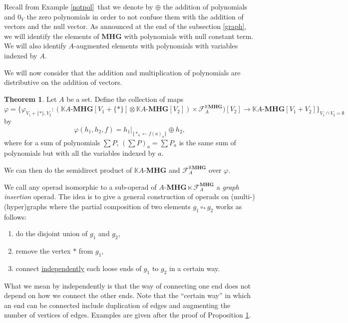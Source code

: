 \documentclass[a4paper]{article}
\DeclareMathOperator{\op}{\mathcal{O}}
\theoremstyle{definition}
\newtheorem{theorem}[definition]{Theorem}
\newcommand{\K}{\mathbb{K}}
\newcommand{\MHG}{\mathbf{MHG}}
\begin{document}
Recall from Example \ref{notpol} that we denote by $\oplus$ the addition of 
polynomials and $0_{V}$ the zero polynomials in order to not confuse them with 
the addition of vectors and the null vector. As announced at the end of the 
subsection \ref{graph}, we will identify the elements of $\MHG$ with polynomials 
with null constant term. We will also identify $A$-augmented elements with 
polynomials with variables indexed by $A$.

We will now consider that the addition and multiplication of polynomials are 
distributive on the addition of vectors.

\begin{theorem}
\label{propins}
	Let $A$ be a set. Define the collection of maps $\varphi=\{\varphi_{V_1+\{\ast\},V_2}:
	(\K A\text{-}\MHG[V_1+\{\ast\}]\otimes\K A\text{-}\MHG[V_2])\times \mathcal{F}_A^{\K \MHG})[V_2]
	\rightarrow \K A\text{-}\MHG[V_1+V_2]\}_{V_1\cap V_2=\emptyset}$ by
	\begin{equation}
		\varphi(h_1,h_2,f) = h_1|_{\{\ast_a\leftarrow f(a)_a\}}\oplus h_2,
	\end{equation}
	where for a sum of polynomials $\sum P$, $(\sum P)_a = \sum P_a$ is the same sum 
	of polynomials but with all the variables indexed by $a$.

	We can then do the semidirect product of $\K A\text{-}\MHG$ and $\mathcal{F}_A^{\K \MHG}$ over $\varphi$.
\end{theorem}

We call any operad isomorphic to a sub-operad of $A\text{-}\MHG\ltimes\mathcal{F}_A^{\MHG}$ 
a {\em graph insertion} operad. The idea is to give a general construction of 
operads on (multi-)(hyper)graphs where the partial composition of two elements 
$g_1\circ_{\ast}g_2$ works as follows:
\begin{enumerate}
	\item do the disjoint union of $g_1$ and $g_2$,
	\item remove the vertex $\ast$ from $g_1$,
	\item connect \underline{independently} each loose ends of $g_1$ to $g_2$ in a certain way.
\end{enumerate}
\noindent What we mean by independently is that the way of connecting one end does not depend on 
how we connect the other ends. Note that the ``certain way'' in which an end can be 
connected include duplication of edges and augmenting the number of vertices of edges. 
Examples are given after the proof of Proposition \ref{propins}.
\end{document}
